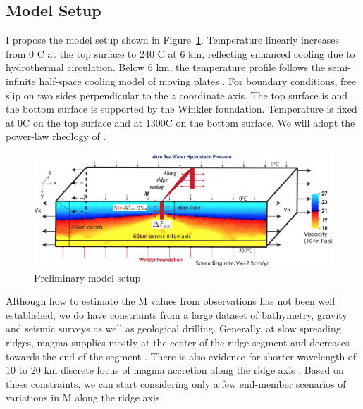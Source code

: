 \documentclass[12pt]{article}
\begin{document}
\subsection{Model Setup}

I propose the model setup shown in Figure~\ref{fig8_1}. Temperature linearly increases from 0 \degree C at the top surface to 240 \degree C at 6 km, reflecting enhanced cooling due to hydrothermal circulation. Below 6 km, the temperature profile follows the semi-infinite half-space cooling model of moving plates \citep[e.g.,][]{Turcotte2002}. For boundary conditions, free slip on two sides perpendicular to the $z$ coordinate axis. The top surface is  and the bottom surface is supported by the Winkler foundation. Temperature is fixed at 0\degree C on the top surface and at 1300\degree C on the bottom surface. We will adopt the power-law rheology of  \citep{Kirby1987}. 

\begin{figure}[H]
 \centering
  \includegraphics[scale=0.55]{fig8_2.png}
 \caption{\small Preliminary model setup}
 \label{fig8_1}
\end{figure}

Although how to estimate the M values from observations has not been well established, we do have constraints from a large dataset of bathymetry, gravity and seismic surveys as well as geological drilling. Generally, at slow spreading ridges, magma supplies mostly at the center of the ridge segment and decreases towards the end of the segment \citep{Tolstoy1993,Chen1999}. There is also evidence for shorter wavelength of 10 to 20 km discrete focus of magma accretion along the ridge axis \citep{Lin1990}. Based on these constraints, we can start considering only a few end-member scenarios of variations in M along the ridge axis. 
\end{document}
